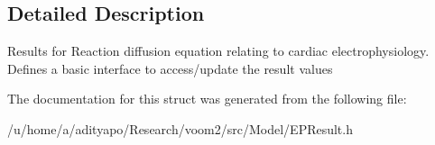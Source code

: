 \subsection{Detailed Description}
Results for Reaction diffusion equation relating to cardiac electrophysiology. Defines a basic interface to access/update the result values 

The documentation for this struct was generated from the following file:\begin{DoxyCompactItemize}
\item 
/u/home/a/adityapo/Research/voom2/src/Model/EPResult.h\end{DoxyCompactItemize}
